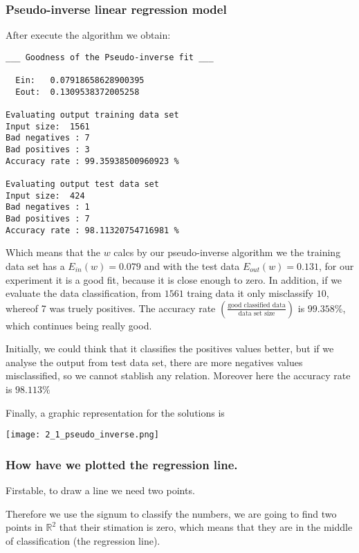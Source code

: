   \subsubsection{Pseudo-inverse linear regression model}

  After execute the algorithm we obtain:

\begin{verbatim}
___ Goodness of the Pseudo-inverse fit ___

  Ein:   0.07918658628900395
  Eout:  0.1309538372005258

Evaluating output training data set
Input size:  1561
Bad negatives : 7
Bad positives : 3
Accuracy rate : 99.35938500960923 %

Evaluating output test data set
Input size:  424
Bad negatives : 1
Bad positives : 7
Accuracy rate : 98.11320754716981 %

\end{verbatim}

  Which means that the $w$ calcs by our pseudo-inverse algorithm we the training data set has a $E_{in}(w) = 0.079$ and with the test data $E_{out}(w) = 0.131$, for our experiment it is a good fit, because it is close enough to zero. In addition, if we evaluate the data classification,
  from $1561$ traing data it only misclassify $10$, whereof 7 was truely positives. The accuracy rate $(\frac{\text{good classified data}}{\text{data set size}})$
  is $99.358 \%$, which continues being really good.

  Initially, we could think that it classifies the positives values better, but if we analyse the output from test data set, there are more negatives values misclassified, so we cannot stablish any relation. Moreover here the accuracy rate is $98.113 \%$

  Finally, a graphic representation for the solutions is

  
  \texttt{[image: 2\_1\_pseudo\_inverse.png]}


  \subsubsection{How have we plotted the regression line.}

  Firstable, to draw a line we need two points.

  Therefore we use the signum to classify the numbers, we are going to find two points in $\mathbb R^2$ that their stimation is zero, which means that they are in the middle of classification (the regression line).


